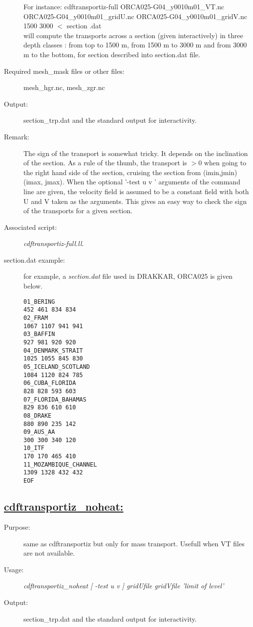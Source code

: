 \documentclass[a4paper,11pt]{article}
\begin{document}
\begin{description}
For instance: cdftransportiz-full ORCA025-G04\_y0010m01\_VT.nc ORCA025-G04\_y0010m01\_gridU.nc  ORCA025-G04\_y0010m01\_gridV.nc 
1500 3000 $<$ section .dat \\
will compute the transports across a section (given interactively) in three depth classes : from top to 1500 m, from 1500 m
to 3000 m and from 3000 m to the bottom, for section described into section.dat file.
\item[Required mesh\_mask files or other files:]   mesh\_hgr.nc, mesh\_zgr.nc
\item[Output:]section\_trp.dat and the standard output for interactivity.
\item[Remark:] The sign of the transport is somewhat tricky. It depends on the inclination of the section. As a rule of 
the thumb, the transport is $>0$ when going to the right hand side of the section, cruising the section from (imin,jmin) 
(imax, jmax). When the optional '-test u v ' arguments of the command line are  given, the velocity field is assumed to 
be a constant field with both U and V taken as the arguments. This gives an easy way to check the sign of the transports for a given section.
\item[Associated script:] {\em cdftransportiz-full.ll}. 
\item[section.dat example:] for example, a {\em section.dat} file used in DRAKKAR, ORCA025 is given below.
\begin{verbatim}
01_BERING
452 461 834 834
02_FRAM
1067 1107 941 941
03_BAFFIN
927 981 920 920
04_DENMARK_STRAIT
1025 1055 845 830
05_ICELAND_SCOTLAND
1084 1120 824 785
06_CUBA_FLORIDA
828 828 593 603
07_FLORIDA_BAHAMAS
829 836 610 610
08_DRAKE
880 890 235 142
09_AUS_AA
300 300 340 120
10_ITF
170 170 465 410
11_MOZAMBIQUE_CHANNEL
1309 1328 432 432
EOF
\end{verbatim}
\end{description}

\subsection*{\underline{cdftransportiz\_noheat:}}
\begin{description}
\item[Purpose:] same as cdftransportiz but only for mass transport. Usefull when VT files are not available.
\item[Usage:] {\em cdftransportiz\_noheat [ -test u v ] gridUfile gridVfile  'limit of level' }
\item[Output:]section\_trp.dat and the standard output for interactivity.
\end{description}
\end{document}
